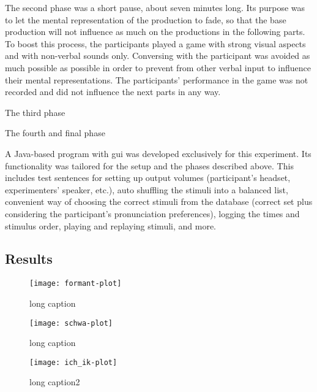 The second phase was a short pause, about seven minutes long.
Its purpose was to let the mental representation of the production to fade, so that the base production will not influence as much on the productions in the following parts.
To boost this process, the participants played a game with strong visual aspects and with non-verbal sounds only.
Conversing with the participant was avoided as much possible as possible in order to prevent from other verbal input to influence their mental representations.
The participants' performance in the game was not recorded and did not influence the next parts in any way.

The third phase

The fourth and final phase

A Java-based program with \ac{gui} was developed exclusively for this experiment.
Its functionality was tailored for the setup and the phases described above.
This includes test sentences for setting up output volumes (participant's headset, experimenters' speaker, etc.), auto shuffling the stimuli into a balanced list, convenient way of choosing the correct stimuli from the database (correct set plus considering the participant's pronunciation preferences), logging the times and stimulus order, playing and replaying stimuli, and more.

\subsection{Results}
\label{Results_HCIConv}

\begin{figure}[!t]
	\centering
	\texttt{[image: formant-plot]}
	\caption[short caption]{long caption}
	\label{fig:HCIConvFormants}
\end{figure}


\begin{figure}[!t]
	\centering
	\texttt{[image: schwa-plot]}
	\caption[short caption]{long caption}
	\label{fig:HCIConvSchwaPlot}
\end{figure}

\begin{figure}[!t]
	\centering
	\texttt{[image: ich\_ik-plot]}
	\caption[short caption]{long caption2}
	\label{fig:HCIConvIcIkPlot}
\end{figure}

